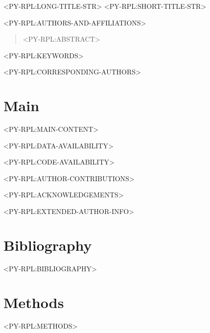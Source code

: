 \documentclass[times, twoside]{HenriquesLab_style}
\begin{document}
<PY-RPL:LONG-TITLE-STR>
<PY-RPL:SHORT-TITLE-STR>

<PY-RPL:AUTHORS-AND-AFFILIATIONS>

\maketitle

\begin{abstract}

<PY-RPL:ABSTRACT>

\end{abstract}

<PY-RPL:KEYWORDS>

<PY-RPL:CORRESPONDING-AUTHORS>

\section*{Main}
<PY-RPL:MAIN-CONTENT>

\begin{data}
<PY-RPL:DATA-AVAILABILITY>
\end{data}

\begin{code}
<PY-RPL:CODE-AVAILABILITY>
\end{code}

\begin{contributions}
<PY-RPL:AUTHOR-CONTRIBUTIONS>
\end{contributions}

\begin{acknowledgements}
<PY-RPL:ACKNOWLEDGEMENTS>
\end{acknowledgements}

\begin{exauthor}
<PY-RPL:EXTENDED-AUTHOR-INFO>
\end{exauthor}

\section*{Bibliography}
<PY-RPL:BIBLIOGRAPHY>

\section*{Methods}
<PY-RPL:METHODS>

\onecolumn
\newpage




\end{document}
